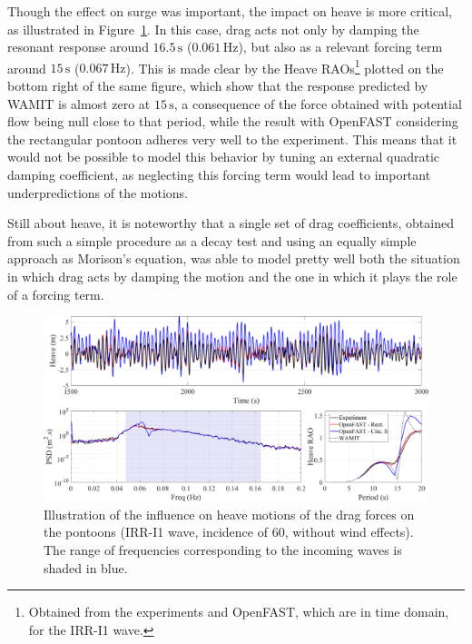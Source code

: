 Though the effect on surge was important, the impact on heave is more critical, as illustrated in Figure~\ref{fig:exp_vs_num:drag:ptfmheave}. In this case, drag acts not only by damping the resonant response around $16.5\,\text{s}$ ($0.061\,\text{Hz}$), but also as a relevant forcing term around $15\,\text{s}$ ($0.067\,\text{Hz}$). This is made clear by the Heave RAOs\footnote{Obtained from the experiments and OpenFAST, which are in time domain, for the IRR-I1 wave.} plotted on the bottom right of the same figure, which show that the response predicted by WAMIT is almost zero at $15\,\text{s}$, a consequence of the force obtained with potential flow being null close to that period, while the result with OpenFAST considering the rectangular pontoon adheres very well to the experiment. This means that it would not be possible to model this behavior by tuning an external quadratic damping coefficient, as neglecting this forcing term would lead to important underpredictions of the motions. 

Still about heave, it is noteworthy that a single set of drag coefficients, obtained from such a simple procedure as a decay test and using an equally simple approach as Morison's equation, was able to model pretty well both the situation in which drag acts by damping the motion and the one in which it plays the role of a forcing term.
\begin{figure}[!hbtp]
	\centering
	\includegraphics[width=\textwidth]{./figures/ptfmheave-drag_pontoon.png}	
	\caption{Illustration of the influence on heave motions of the drag forces on the pontoons (IRR-I1 wave, incidence of 60\textdegree{}, without wind effects). The range of frequencies corresponding to the incoming waves is shaded in blue.} \label{fig:exp_vs_num:drag:ptfmheave}
\end{figure}








